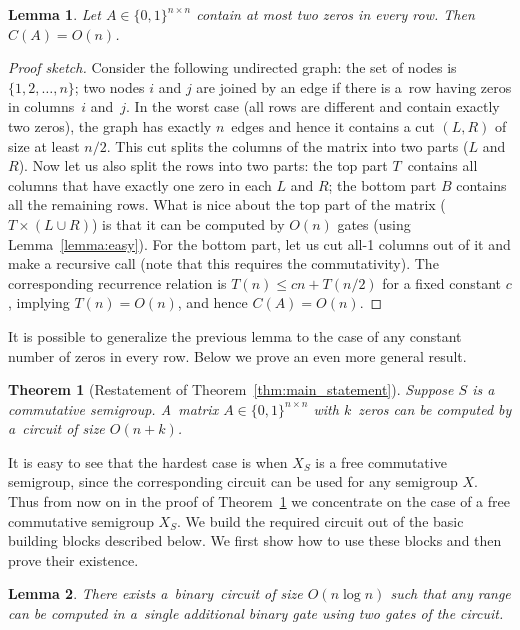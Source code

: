 \documentclass[11pt,letterpaper]{article}
\newtheorem{lemma}{Lemma}
\newtheorem{theorem}{Theorem}
\begin{document}
\begin{lemma} \label{lem:at_most_2}
Let $A \in \{0,1\}^{n \times n}$ contain at most two zeros in every row. Then
$C(A) = O(n)$.
\end{lemma}
\begin{proof}[Proof sketch]
Consider the following undirected graph: the set of nodes is $\{1,2,\dotsc,n\}$;
two nodes $i$ and $j$ are joined by an edge if there is a~row having zeros in
columns~$i$ and~$j$. In the worst case (all rows are different and contain
exactly two zeros), the graph has exactly $n$~edges and hence it contains a cut
$(L,R)$ of size at least $n/2$. This cut splits the columns of the matrix into
two parts ($L$ and $R$). Now let us also split the rows into two parts: the top
part $T$~contains all columns that have exactly one zero in each $L$ and $R$;
the bottom part $B$ contains all the remaining rows. What is nice about the top
part of the matrix ($T \times (L \cup R)$) is that it can be computed by $O(n)$
gates (using Lemma~\ref{lemma:easy}). For the bottom part, let us cut all-1
columns out of it and make a recursive call (note that this requires the
commutativity). The corresponding recurrence relation is $T(n) \le cn + T(n/2)$
for a fixed constant $c$, implying $T(n)=O(n)$, and hence $C(A) = O(n)$.
\end{proof}

It is possible to generalize the previous lemma to the case of
any constant number of zeros in every row. Below we prove
an even more general result.


\begin{theorem}[Restatement of Theorem~\ref{thm:main_statement}]\label{thm:main}
Suppose $S$ is a commutative semigroup. A~matrix $A \in \{0,1\}^{n \times n}$
with $k$~zeros can be computed by a~circuit of size $O(n+k)$.
\end{theorem}

It is easy to see that the hardest case is when $X_S$ is a free commutative
semigroup, since the corresponding circuit can be used for any semigroup $X$.
Thus from now on in the proof of Theorem~\ref{thm:main} we concentrate on the
case of a free commutative semigroup $X_S$. We build the required circuit out
of the basic building blocks described below. We first show how to use these
blocks and then prove their existence.

\begin{lemma}\label{lemma:decompose}
There exists a~binary~circuit of size $O(n\log n)$ such that
any range can be computed in a~single additional binary gate
using two gates of the circuit.
\end{lemma}
\end{document}
